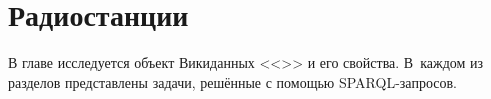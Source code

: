 \chapter[Радиостанции]{Радиостанции}
\label{ch:radio-station}

В главе исследуется объект Викиданных <<>> и его свойства. 
В~каждом из разделов представлены задачи, решённые с помощью SPARQL-запросов. 
%

